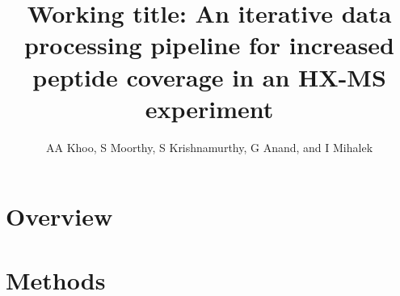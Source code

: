 \documentclass[10pt]{scrartcl}
\title{Working title: An iterative data processing  pipeline for increased peptide coverage in an HX-MS experiment}
\author{AA Khoo, S Moorthy, S Krishnamurthy, G Anand, and I Mihalek}
\begin{document}
\maketitle
\begin{abstract}


\end{abstract}


\section{Overview}
\section{Methods}



 
\end{document}
